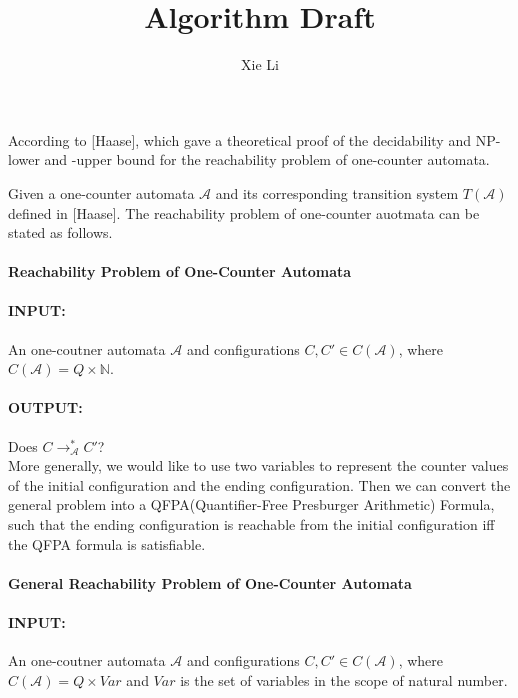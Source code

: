 \documentclass{article}
\title{Algorithm Draft}
\author{Xie Li}
\begin{document}
\maketitle



According to [Haase], which gave a theoretical proof of the decidability and NP-lower and -upper bound for the reachability problem of one-counter automata.

Given a one-counter automata $\mathcal{A}$ and its corresponding transition system $T(\mathcal{A})$ defined in [Haase]. The reachability problem of one-counter auotmata can be stated as follows.

\paragraph{Reachability Problem of One-Counter Automata}

\paragraph{INPUT:} An one-coutner automata $\mathcal{A}$ and configurations $C, C'\in C(\mathcal{A})$, where $C(\mathcal{A}) = Q \times \mathbb{N}$.

\paragraph{OUTPUT:} Does $C \rightarrow^*_\mathcal{A} C'$?\\


More generally, we would like to use two variables to represent the counter values of the initial configuration and the ending configuration. Then we can convert the general problem into a QFPA(Quantifier-Free Presburger Arithmetic) Formula, such that the ending configuration is reachable from the initial configuration iff the QFPA formula is satisfiable.

\paragraph{General Reachability Problem of One-Counter Automata}

\paragraph{INPUT:} An one-coutner automata $\mathcal{A}$ and configurations $C, C'\in C(\mathcal{A})$, where $C(\mathcal{A}) = Q \times Var$ and $Var$ is the set of variables in the scope of natural number.
\end{document}
